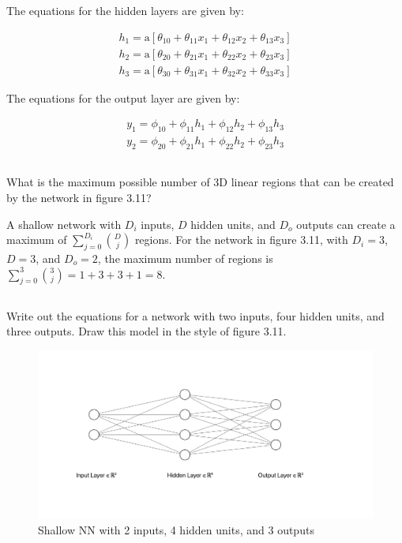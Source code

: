 \documentclass[12pt]{report}
\begin{document}
The equations for the hidden layers are given by:

\begin{align*}
    h_{1} = \text{a}\left[ \theta_{10} + \theta_{11}x_{1} + \theta_{12}x_{2} + \theta_{13}x_{3} \right] \\
    h_{2} = \text{a}\left[ \theta_{20} + \theta_{21}x_{1} + \theta_{22}x_{2} + \theta_{23}x_{3} \right] \\
    h_{3} = \text{a}\left[ \theta_{30} + \theta_{31}x_{1} + \theta_{32}x_{2} + \theta_{33}x_{3} \right]
\end{align*}

The equations for the output layer are given by:

\begin{align*}
    y_{1} = \phi_{10} + \phi_{11}h_{1} + \phi_{12}h_{2} + \phi_{13}h_{3} \\
    y_{2} = \phi_{20} + \phi_{21}h_{1} + \phi_{22}h_{2} + \phi_{23}h_{3}
\end{align*}

\newpage
\subsection{}
\begin{mdframed}
    What is the maximum possible number of 3D linear regions that can be created by the network in figure 3.11?
\end{mdframed}

A shallow network with $D_{i}$ inputs, $D$ hidden units, and $D_{o}$ outputs can create a maximum of $\sum_{j=0}^{D_{i}} \binom{D}{j}$ regions. For the network in figure 3.11, with $D_{i} = 3$, $D = 3$, and $D_{o} = 2$, the maximum number of regions is $\sum_{j=0}^{3} \binom{3}{j} = 1 + 3 + 3 + 1 = 8$.

\subsection{}
\begin{mdframed}
    Write out the equations for a network with two inputs, four hidden units, and three outputs. Draw this model in the style of figure 3.11.
\end{mdframed}

\begin{figure}[h]
    \centering
    \includegraphics[width=\textwidth]{3_16.png}
    \caption{Shallow NN with 2 inputs, 4 hidden units, and 3 outputs}
\end{figure}
\end{document}
